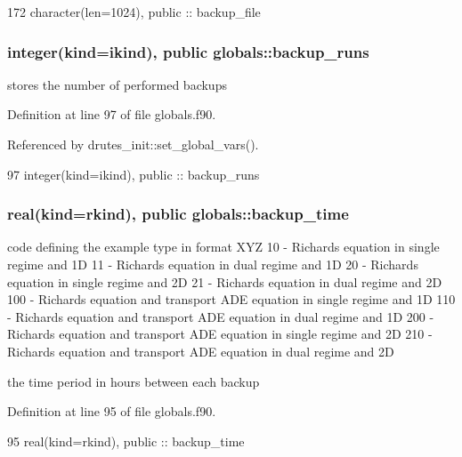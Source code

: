 \begin{DoxyCode}
172   \textcolor{keywordtype}{character(len=1024)}, \textcolor{keywordtype}{public} :: backup_file
\end{DoxyCode}
\subsubsection[{backup\+\_\+runs}]{\setlength{\rightskip}{0pt plus 5cm}integer(kind=ikind), public globals\+::backup\+\_\+runs}\label{namespaceglobals_a1c7b2194ec62acb4222f9bb1a66db53d}


stores the number of performed backups 



Definition at line 97 of file globals.\+f90.



Referenced by drutes\+\_\+init\+::set\+\_\+global\+\_\+vars().


\begin{DoxyCode}
97   \textcolor{keywordtype}{integer(kind=ikind)}, \textcolor{keywordtype}{public} :: backup_runs
\end{DoxyCode}
\subsubsection[{backup\+\_\+time}]{\setlength{\rightskip}{0pt plus 5cm}real(kind=rkind), public globals\+::backup\+\_\+time}\label{namespaceglobals_aebf3cf621f33866c0c846fc17491261e}


code defining the example type in format X\+YZ 10 -\/ Richards equation in single regime and 1D 11 -\/ Richards equation in dual regime and 1D 20 -\/ Richards equation in single regime and 2D 21 -\/ Richards equation in dual regime and 2D 100 -\/ Richards equation and transport A\+DE equation in single regime and 1D 110 -\/ Richards equation and transport A\+DE equation in dual regime and 1D 200 -\/ Richards equation and transport A\+DE equation in single regime and 2D 210 -\/ Richards equation and transport A\+DE equation in dual regime and 2D 

the time period in hours between each backup 

Definition at line 95 of file globals.\+f90.


\begin{DoxyCode}
95   \textcolor{keywordtype}{real(kind=rkind)}, \textcolor{keywordtype}{public} :: backup_time
\end{DoxyCode}
